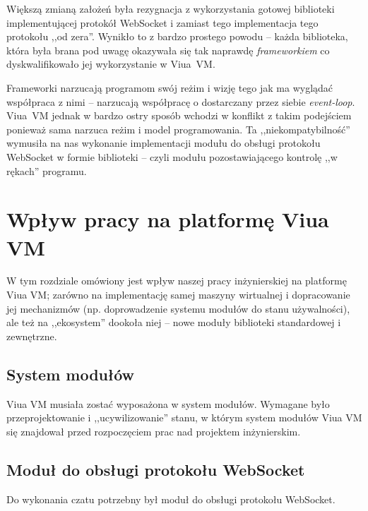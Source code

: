 Większą zmianą założeń była rezygnacja z wykorzystania gotowej biblioteki
implementującej protokół WebSocket i zamiast tego implementacja tego protokołu
,,od zera''. Wynikło to z bardzo prostego powodu -- każda biblioteka, która
była brana pod uwagę okazywała się tak naprawdę \emph{frameworkiem} co
dyskwalifikowało jej wykorzystanie w Viua~VM.

Frameworki narzucają programom swój reżim i wizję tego jak ma wyglądać
współpraca z nimi -- narzucają współpracę o dostarczany przez siebie
\emph{event-loop}. Viua~VM jednak w bardzo ostry sposób wchodzi w konflikt z
takim podejściem ponieważ sama narzuca reżim i model programowania.  Ta
,,niekompatybilność'' wymusiła na nas wykonanie implementacji modułu do obsługi
protokołu WebSocket w formie biblioteki -- czyli modułu pozostawiającego
kontrolę ,,w rękach'' programu.

\section{Wpływ pracy na platformę Viua VM}

W tym rozdziale omówiony jest wpływ naszej pracy inżynierskiej na platformę Viua VM; zarówno na implementację
samej maszyny wirtualnej i dopracowanie jej mechanizmów (np. doprowadzenie systemu modułów do stanu
używalności), ale też na ,,ekosystem'' dookoła niej -- nowe moduły biblioteki standardowej i zewnętrzne.

\subsection{System modułów}

Viua VM musiała zostać wyposażona w system modułów. Wymagane było przeprojektowanie i ,,ucywilizowanie''
stanu, w którym system modułów Viua VM się znajdował przed rozpoczęciem prac nad projektem inżynierskim.

\subsection{Moduł do obsługi protokołu WebSocket}

Do wykonania czatu potrzebny był moduł do obsługi protokołu WebSocket.
